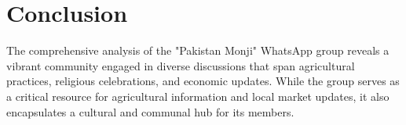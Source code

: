 \documentclass[12pt]{article}
\begin{document}
\section{Conclusion}
The comprehensive analysis of the "Pakistan Monji" WhatsApp group reveals a vibrant community engaged in diverse discussions that span agricultural practices, religious celebrations, and economic updates. While the group serves as a critical resource for agricultural information and local market updates, it also encapsulates a cultural and communal hub for its members.
\end{document}
